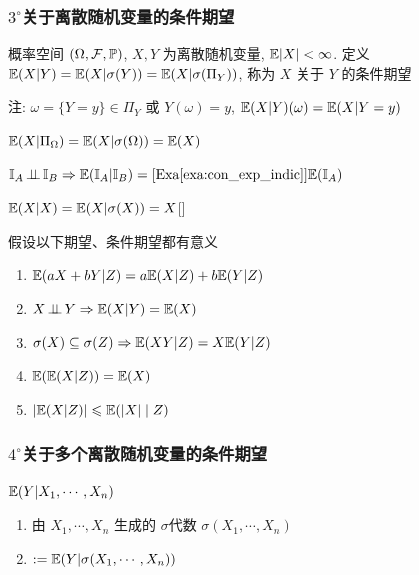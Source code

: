 \subsubsection*{$3^\circ$关于离散随机变量的条件期望}

\begin{definition}
    概率空间 $(\Omega,\mathcal{F},\mathbb{P})$, $X,Y$ 为离散随机变量, $\mathbb E|X|<\infty$. 定义 $\mathbb E(X|Y)=\mathbb E(X|\sigma(Y))=\mathbb E(X|\sigma(\Pi_Y))$, 称为 $X$ 关于 $Y$ 的条件期望
\end{definition}

注: $\omega=\{Y=y\}\in \Pi_Y$ 或 $Y(\omega)=y$, $\mathbb E(X|Y)(\omega)=\mathbb E(X|Y=y)$

\begin{example}
    $\mathbb E(X|\Pi_{\Omega})=\mathbb E(X|\sigma(\Omega))=\mathbb E(X)$
\end{example}

\begin{example}
    $\mathbb I_A\operatorname{\perp\!\!\!\perp} \mathbb I_B\Rightarrow \mathbb E(\mathbb I_A|\mathbb I_B)=[\text{Exa\eqref{exa:con_exp_indic}}]\mathbb E(\mathbb I_A)$
\end{example}

\begin{example}
    $\mathbb E(X|X)=\mathbb E(X|\sigma(X))=X$[]
\end{example}

\begin{property}
    假设以下期望、条件期望都有意义
    \begin{enumerate}
        \item $\mathbb E(aX+bY|Z)=a\mathbb E(X|Z)+b\mathbb E(Y|Z)$
        \item $X\operatorname{\perp\!\!\!\perp} Y\Rightarrow \mathbb E(X|Y)=\mathbb E(X)$
        \item $\sigma(X)\subseteq \sigma(Z)\Rightarrow \mathbb E(XY|Z)=X\mathbb E(Y|Z)$
        \item $\mathbb E(\mathbb E(X|Z))=\mathbb E(X)$
        \item $|\mathbb E(X|Z)|\leqslant \mathbb E(|X|\mid Z)$
    \end{enumerate}
\end{property}

\subsubsection*{$4^\circ$关于多个离散随机变量的条件期望}

$\mathbb E(Y|X_1,\cdots,X_n)$

\begin{enumerate}
    \item 由 $X_1,\cdots ,X_n$ 生成的 $\sigma$代数 $\sigma(X_1,\cdots,X_n)$
    \item $:=\mathbb E(Y|\sigma(X_1,\cdots ,X_n))$
\end{enumerate}

